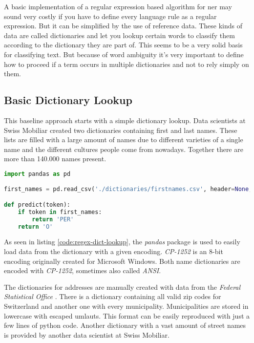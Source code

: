 A basic implementation of a regular expression based algorithm for \acrlong{ner} may sound very costly if you have to define every language rule
as a regular expression. But it can be simplified by the use of reference data. These kinds of data are called dictionaries and let you lookup
certain words to classify them according to the dictionary they are part of. This seems to be a very solid basis for classifying text. But because
of word ambiguity it's very important to define how to proceed if a term occurs in multiple dictionaries and not to rely simply on them.

\subsection{Basic Dictionary Lookup}

This baseline approach starts with a simple dictionary lookup. Data scientists at Swiss Mobiliar created two dictionaries containing first and last names.
These lists are filled with a large amount of names due to different varieties of a single name and the different cultures people come from nowadays.
Together there are more than 140.000 names present.

\begin{lstlisting}[language=Python, label={code:regex-dict-lookup}, caption=Simple dictionary lookup]
import pandas as pd

first_names = pd.read_csv('./dictionaries/firstnames.csv', header=None, encoding='cp1252')[0]

def predict(token):
    if token in first_names:
        return 'PER'
    return 'O'
\end{lstlisting}

As seen in listing \ref{code:regex-dict-lookup}, the \emph{pandas} package is used to easily load data from the dictionary with a given encoding. \emph{CP-1252}
is an 8-bit encoding originally created for Microsoft Windows. Both name dictionaries are encoded with \emph{CP-1252}, sometimes also called \emph{ANSI}.

The dictionaries for addresses are manually created with data from the \emph{Federal Statistical Office} \cite{bfs}. There is a dictionary containing
all valid zip codes for Switzerland and another one with every municipality. Municipalities are stored in lowercase with escaped umlauts. This format
can be easily reproduced with just a few lines of python code. Another dictionary with a vast amount of street names is provided by another data scientist
at Swiss Mobiliar.

